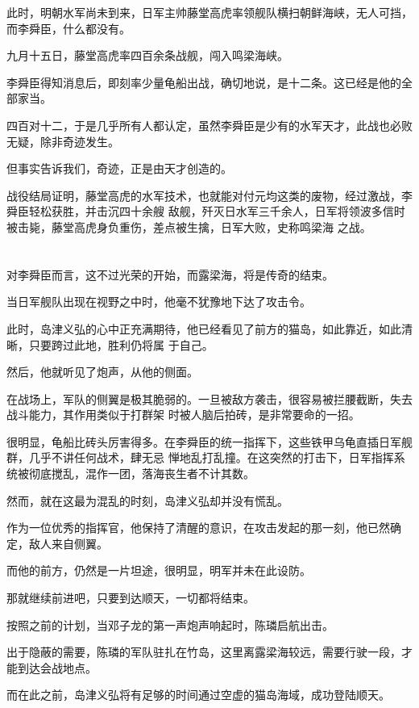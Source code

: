 \documentclass[11pt,a4paper,onecolumn]{article}
\begin{document}
此时，明朝水军尚未到来，日军主帅藤堂高虎率领舰队横扫朝鲜海峡，无人可挡，而李舜臣，什么都没有。

九月十五日，藤堂高虎率四百余条战舰，闯入鸣梁海峡。

李舜臣得知消息后，即刻率少量龟船出战，确切地说，是十二条。这已经是他的全部家当。

四百对十二，于是几乎所有人都认定，虽然李舜臣是少有的水军天才，此战也必败无疑，除非奇迹发生。

但事实告诉我们，奇迹，正是由天才创造的。

战役结局证明，藤堂高虎的水军技术，也就能对付元均这类的废物，经过激战，李舜臣轻松获胜，并击沉四十余艘
敌舰，歼灭日水军三千余人，日军将领波多信时被击毙，藤堂高虎身负重伤，差点被生擒，日军大败，史称鸣梁海
之战。

\section[\thesection]{}

对李舜臣而言，这不过光荣的开始，而露梁海，将是传奇的结束。

当日军舰队出现在视野之中时，他毫不犹豫地下达了攻击令。

此时，岛津义弘的心中正充满期待，他已经看见了前方的猫岛，如此靠近，如此清晰，只要跨过此地，胜利仍将属
于自己。

然后，他就听见了炮声，从他的侧面。

在战场上，军队的侧翼是极其脆弱的。一旦被敌方袭击，很容易被拦腰截断，失去战斗能力，其作用类似于打群架
时被人脑后拍砖，是非常要命的一招。

很明显，龟船比砖头厉害得多。在李舜臣的统一指挥下，这些铁甲乌龟直插日军舰群，几乎不讲任何战术，肆无忌
惮地乱打乱撞。在这突然的打击下，日军指挥系统被彻底搅乱，混作一团，落海丧生者不计其数。

然而，就在这最为混乱的时刻，岛津义弘却并没有慌乱。

作为一位优秀的指挥官，他保持了清醒的意识，在攻击发起的那一刻，他已然确定，敌人来自侧翼。

而他的前方，仍然是一片坦途，很明显，明军并未在此设防。

那就继续前进吧，只要到达顺天，一切都将结束。

按照之前的计划，当邓子龙的第一声炮声响起时，陈璘启航出击。

出于隐蔽的需要，陈璘的军队驻扎在竹岛，这里离露梁海较远，需要行驶一段，才能到达会战地点。

而在此之前，岛津义弘将有足够的时间通过空虚的猫岛海域，成功登陆顺天。
\end{document}
